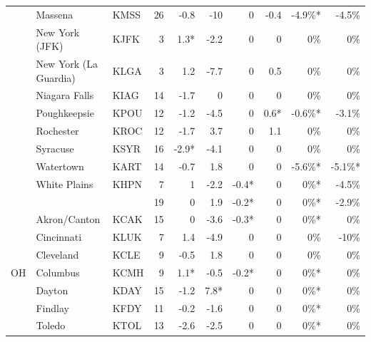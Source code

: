 \documentclass[twocol]{ametsoc}
\begin{document}
\begin{landscape}
\begin{table}[]
\begin{tabular}{cllrrrrrrr}
                     & Massena                    & KMSS & 26   & -0.8  & -10   & 0     & -0.4 & -4.9\%* & -4.5\%   \\
                     & New York (JFK)             & KJFK & 3    & 1.3*  & -2.2  & 0     & 0    & 0\%     & 0\%      \\
                     & New York (La Guardia)      & KLGA & 3    & 1.2   & -7.7  & 0     & 0.5  & 0\%     & 0\%      \\
                     & Niagara Falls              & KIAG & 14   & -1.7  & 0     & 0     & 0    & 0\%     & 0\%      \\
                     & Poughkeepsie               & KPOU & 12   & -1.2  & -4.5  & 0     & 0.6* & -0.6\%* & -3.1\%   \\
                     & Rochester                  & KROC & 12   & -1.7  & 3.7   & 0     & 1.1  & 0\%     & 0\%      \\
                     & Syracuse                   & KSYR & 16   & -2.9* & -4.1  & 0     & 0    & 0\%     & 0\%      \\
                     & Watertown                  & KART & 14   & -0.7  & 1.8   & 0     & 0    & -5.6\%* & -5.1\%*  \\
                     & White Plains               & KHPN & 7    & 1     & -2.2  & -0.4* & 0    & 0\%*    & -4.5\%   \\ \cline{2-10} 
                     &                            &      & 19   & 0     & 1.9   & -0.2* & 0    & 0\%*    & -2.9\%   \\ \hline
\multirow{9}{*}{OH}  & Akron/Canton               & KCAK & 15   & 0     & -3.6  & -0.3* & 0    & 0\%*    & 0\%      \\
                     & Cincinnati                 & KLUK & 7    & 1.4   & -4.9  & 0     & 0    & 0\%     & -10\%    \\
                     & Cleveland                  & KCLE & 9    & -0.5  & 1.8   & 0     & 0    & 0\%     & 0\%      \\
                     & Columbus                   & KCMH & 9    & 1.1*  & -0.5  & -0.2* & 0    & 0\%*    & 0\%      \\
                     & Dayton                     & KDAY & 15   & -1.2  & 7.8*  & 0     & 0    & 0\%*    & 0\%      \\
                     & Findlay                    & KFDY & 11   & -0.2  & -1.6  & 0     & 0    & 0\%*    & 0\%      \\
                     & Toledo                     & KTOL & 13   & -2.6  & -2.5  & 0     & 0    & 0\%*    & 0\%      \\

\end{tabular}
\end{table}
\end{landscape}
\end{document}
